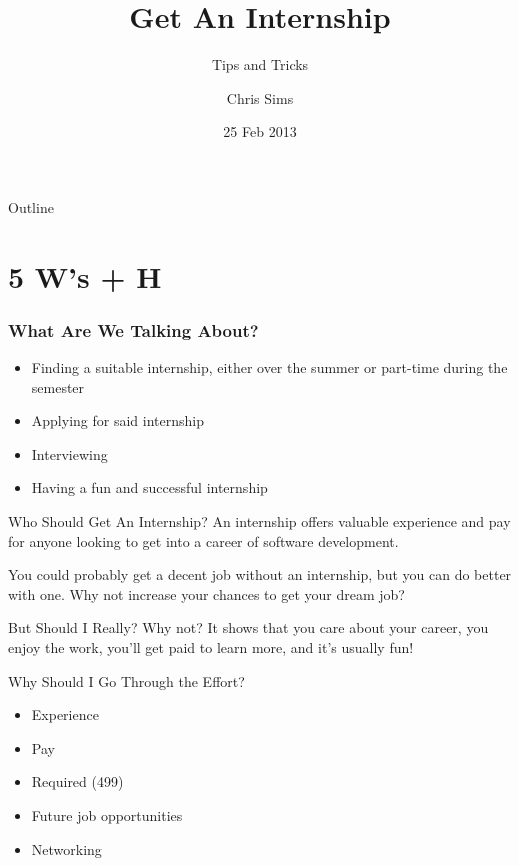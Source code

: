 \documentclass{beamer}
\title{Get An Internship}
\subtitle{Tips and Tricks}
\author{Chris Sims}
\date{25 Feb 2013}
\begin{document}
\frame{\titlepage}

\begin{frame}{Outline}
  \tableofcontents
\end{frame}


\section{5 W's + H}
\begin{frame}\frametitle{What Are We Talking About?}

  \begin{itemize}
    \item Finding a suitable internship, either over the summer or part-time
          during the semester
    \item Applying for said internship
    \item Interviewing
    \item Having a fun and successful internship
  \end{itemize}

\end{frame}

\begin{frame}{Who Should Get An Internship?}
  An internship offers valuable experience and pay for anyone looking to get
  into a career of software development. \\
  \hfill

  You could probably get a decent job without an internship, but you can do
  better with one. Why not increase your chances to get your dream job? \\
  \hfill

  \begin{block}{But Should I Really?}
    Why not? It shows that you care about your career, you enjoy the work,
    you'll get paid to learn more, and it's usually fun!
  \end{block}
\end{frame}

\begin{frame}{Why Should I Go Through the Effort?}

  \begin{itemize}
    \item Experience
    \item Pay
    \item Required (499)
    \item Future job opportunities
    \item Networking
  \end{itemize}

\end{frame}
\end{document}

